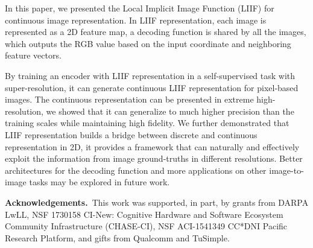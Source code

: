 \documentclass[final]{cvpr}
\begin{document}
In this paper, we presented the Local Implicit Image Function (LIIF) for continuous image representation. In LIIF representation, each image is represented as a 2D feature map, a decoding function is shared by all the images, which outputs the RGB value based on the input coordinate and neighboring feature vectors.

By training an encoder with LIIF representation in a self-supervised task with super-resolution, it can generate continuous LIIF representation for pixel-based images. The continuous representation can be presented in extreme high-resolution, we showed that it can generalize to much higher precision than the training scales while maintaining high fidelity. We further demonstrated that LIIF representation builds a bridge between discrete and continuous representation in 2D, it provides a framework that can naturally and effectively exploit the information from image ground-truths in different resolutions. Better architectures for the decoding function and more applications on other image-to-image tasks may be explored in future work.

\vspace{1em}
{\footnotesize \textbf{Acknowledgements.}~This work was supported, in part, by grants from DARPA LwLL, NSF 1730158 CI-New: Cognitive Hardware and Software Ecosystem Community Infrastructure (CHASE-CI), NSF ACI-1541349 CC*DNI Pacific Research Platform, and gifts from Qualcomm and TuSimple.}

{\small


}
\end{document}
